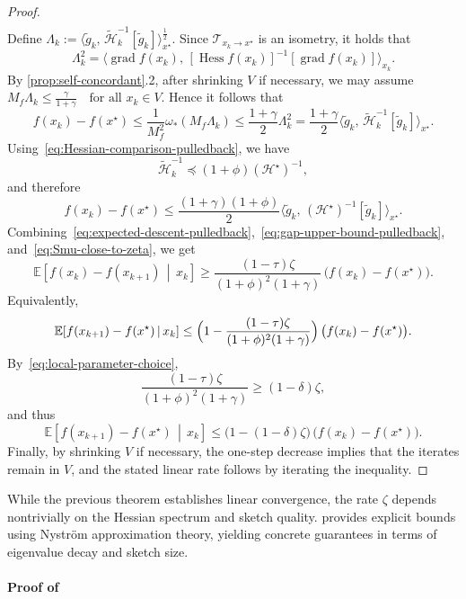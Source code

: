 \documentclass[final,onefignum,onetabnum]{siamart250211}
\DeclareMathOperator{\grad}{grad}
\newcommand{\Hess}{\operatorname{Hess}}
\begin{document}
\begin{proof}
\begin{align}
\end{align}
Define
$
\Lambda_k
:=
\big\langle
\widetilde g_k,\,
\widetilde{\mathcal H}_k^{-1}[\widetilde g_k]
\big\rangle_{x^\star}^{\frac{1}{2}}.
$
Since $\mathcal T_{x_k\to x^\star}$ is an isometry, it holds that
\[
\Lambda_k^2
=
\big\langle
\grad f(x_k),\,
[\Hess f(x_k)]^{-1}[\grad f(x_k)]
\big\rangle_{x_k}.
\]
By \cref{prop:self-concordant}.2, after shrinking $V$ if necessary, we may assume
$
M_f\Lambda_k\le \frac{\gamma}{1+\gamma}\quad \text{for all } x_k\in V.
$
Hence it follows that
\[
f(x_k)-f(x^\star)
\le
\frac{1}{M_f^2}\omega_*(M_f\Lambda_k)
\le
\frac{1+\gamma}{2}\Lambda_k^2
=
\frac{1+\gamma}{2}
\big\langle
\widetilde g_k,\,
\widetilde{\mathcal H}_k^{-1}[\widetilde g_k]
\big\rangle_{x^\star}.
\]
Using~\eqref{eq:Hessian-comparison-pulledback}, we have
\[
\widetilde{\mathcal H}_k^{-1}\preceq (1+\phi)(\mathcal{H}^\star)^{-1},
\]
and therefore
\begin{equation}
f(x_k)-f(x^\star)
\le
\frac{(1+\gamma)(1+\phi)}{2}
\big\langle
\widetilde g_k,\,
(\mathcal{H}^\star)^{-1}[\widetilde g_k]
\big\rangle_{x^\star}.
\label{eq:gap-upper-bound-pulledback}
\end{equation}
Combining~\eqref{eq:expected-descent-pulledback},~\eqref{eq:gap-upper-bound-pulledback}, and~\eqref{eq:Smu-close-to-zeta}, we get
\[
\mathbb E\!\left[f(x_k)-f(x_{k+1})\,\middle|\,x_k\right]
\ge
\frac{(1-\tau)\zeta}{(1+\phi)^2(1+\gamma)}\,\bigl(f(x_k)-f(x^\star)\bigr).
\]
Equivalently,
\[
\mathbb E\!\left[f(x_{k+1})-f(x^\star)\,\middle|\,x_k\right]
\le
\Bigl(1-\frac{(1-\tau)\zeta}{(1+\phi)^2(1+\gamma)}\Bigr)\,\bigl(f(x_k)-f(x^\star)\bigr).
\]
By~\eqref{eq:local-parameter-choice},
\[
\frac{(1-\tau)\zeta}{(1+\phi)^2(1+\gamma)}\ge (1-\delta)\zeta,
\]
and thus
\[
\mathbb E\!\left[f(x_{k+1})-f(x^\star)\,\middle|\,x_k\right]
\le
\bigl(1-(1-\delta)\zeta\bigr)\,\bigl(f(x_k)-f(x^\star)\bigr).
\]
Finally, by shrinking $V$ if necessary, the one-step decrease implies that the iterates remain in $V$, and the stated linear rate follows by iterating the inequality.
\end{proof}

While the previous theorem establishes linear convergence, the rate $\zeta$ depends nontrivially on the Hessian spectrum and sketch quality.  provides explicit bounds using Nystr\"om approximation theory, yielding concrete guarantees in terms of eigenvalue decay and sketch size.

\paragraph{Proof of }
\end{document}
